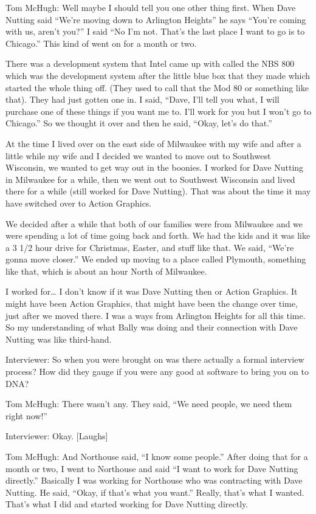 \textcolor{interviewee}{Tom McHugh:} Well maybe I should tell you one other thing first. When Dave Nutting said “We’re moving down to Arlington Heights” he says “You’re coming with us, aren’t you?” I said “No I’m not. That’s the last place I want to go is to Chicago.” This kind of went on for a month or two. 

There was a development system that Intel came up with called the NBS 800 which was the development system after the little blue box that they made which started the whole thing off. (They used to call that the Mod 80 or something like that). They had just gotten one in. I said, “Dave, I’ll tell you what, I will purchase one of these things if you want me to. I’ll work for you but I won’t go to Chicago.” So we thought it over and then he said, “Okay, let’s do that.”

At the time I lived over on the east side of Milwaukee with my wife and after a little while my wife and I decided we wanted to move out to Southwest Wisconsin, we wanted to get way out in the boonies. I worked for Dave Nutting in Milwaukee for a while, then we went out to Southwest Wisconsin and lived there for a while (still worked for Dave Nutting). That was about the time it may have switched over to Action Graphics. 

We decided after a while that both of our families were from Milwaukee and we were spending a lot of time going back and forth. We had the kids and it was like a 3 1/2 hour drive for Christmas, Easter, and stuff like that. We said, “We’re gonna move closer.” We ended up moving to a place called Plymouth, something like that, which is about an hour North of Milwaukee.

I worked for… I don’t know if it was Dave Nutting then or Action Graphics. It might have been Action Graphics, that might have been the change over time, just after we moved there. I was a ways from Arlington Heights for all this time. So my understanding of what Bally was doing and their connection with Dave Nutting was like third-hand.

\textcolor{interviewer}{Interviewer:} So when you were brought on was there actually a formal interview process? How did they gauge if you were any good at software to bring you on to DNA?

\textcolor{interviewee}{Tom McHugh:} There wasn’t any. They said, “We need people, we need them right now!”

\textcolor{interviewer}{Interviewer:} Okay. [Laughs]

\textcolor{interviewee}{Tom McHugh:} And Northouse said, “I know some people.” After doing that for a month or two, I went to Northouse and said “I want to work for Dave Nutting directly.” Basically I was working for Northouse who was contracting with Dave Nutting. He said, “Okay, if that’s what you want.” Really, that’s what I wanted. That’s what I did and started working for Dave Nutting directly.

